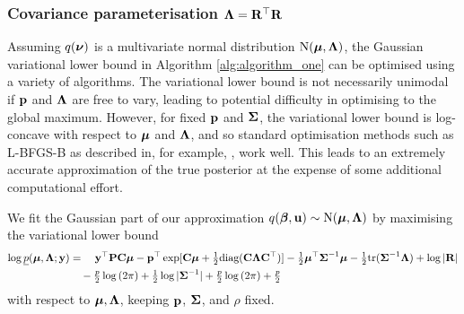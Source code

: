 \documentclass{amsart}[12pt]
\begin{document}
			\subsubsection{Covariance parameterisation ${\boldsymbol \Lambda} = {\bf R}^\top {\bf R}$}
			
			Assuming $q({\boldsymbol \nu})$ is a multivariate normal distribution $\text{N}({\boldsymbol \mu}, {\boldsymbol \Lambda})$, the Gaussian variational lower
			bound in Algorithm \ref{alg:algorithm_one} can be optimised using a variety of algorithms. The variational
			lower bound is not necessarily unimodal if ${\bf p}$ and ${\boldsymbol \Lambda}$ are free to vary, leading to potential
			difficulty in optimising to the global maximum. However, for fixed ${\bf p}$ and ${\boldsymbol \Sigma}$, the variational
			lower bound is log-concave with respect to ${\boldsymbol \mu}$ and ${\boldsymbol \Lambda}$, and so standard optimisation methods such
			as L-BFGS-B as described in, for example, \citep{Liu1989}, work well. This leads to an extremely accurate
			approximation of the true posterior at the expense of some additional computational effort.
					
			We fit the Gaussian part of our approximation $q({\boldsymbol \beta}, {\bf u}) \sim \text{N}({\boldsymbol \mu}, {\boldsymbol \Lambda})$ by maximising 
			the variational lower bound	
			\begin{align*}
				\log \underline{p}({\boldsymbol \mu}, {\boldsymbol \Lambda}; {\bf y}) & = \quad {\bf y}^\top{\bf P} {\bf C} {\boldsymbol\mu} - {\bf p}^\top \exp[{\bf C} {\boldsymbol \mu} + \tfrac{1}{2} \text{diag}({\bf C} {\boldsymbol \Lambda} {\bf C}^\top)] - \tfrac{1}{2} {\boldsymbol \mu}^\top {\boldsymbol\Sigma}^{-1} {\boldsymbol \mu} - \tfrac{1}{2} \text{tr}{({\boldsymbol\Sigma}^{-1} {\boldsymbol\Lambda})} + \log{|{\bf R}|} \\
				                                        & \quad - \tfrac{p}{2} \log{(2 \pi)} + \tfrac{1}{2} \log{|{\boldsymbol\Sigma}^{-1}|} + \tfrac{p}{2} \log{(2 \pi)} + \tfrac{p}{2}                                                                              
			\end{align*}
			\noindent with respect to ${\boldsymbol \mu}, {\boldsymbol \Lambda}$, keeping ${\bf p}$, ${\boldsymbol \Sigma}$, and $\rho$ fixed.
					
\end{document}
